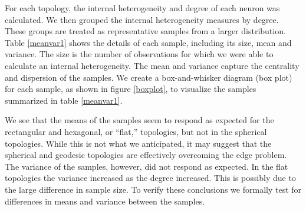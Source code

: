 For each topology, the internal heterogeneity and degree of each neuron was
calculated. We then grouped the internal heterogeneity measures by degree.  These groups are
treated as representative samples from a larger distribution. Table \ref{meanvar1}
shows the details of each sample, including its size, mean and variance. 
The size is the number of observations for which we were able to calculate an
internal heterogeneity. The mean and variance capture the centrality and
dispersion of the samples.  We create a box-and-whisker diagram (box plot) for
each sample, as shown in figure \ref{boxplot}, to visualize the samples
summarized in table \ref{meanvar1}.

We see that the means of the samples seem to respond as expected for the
rectangular and hexagonal, or ``flat,''  topologies, but not in the spherical
topologies.  While this is not what we anticipated, it may suggest that the
spherical and geodesic topologies are effectively overcoming the edge problem.
The variance of the samples, however, did not respond as expected.  In the
flat topologies the variance increased as the degree increased.  This is
possibly due to the large difference in sample size.  To verify these
conclusions we formally test for differences in means and variance between the
samples.

